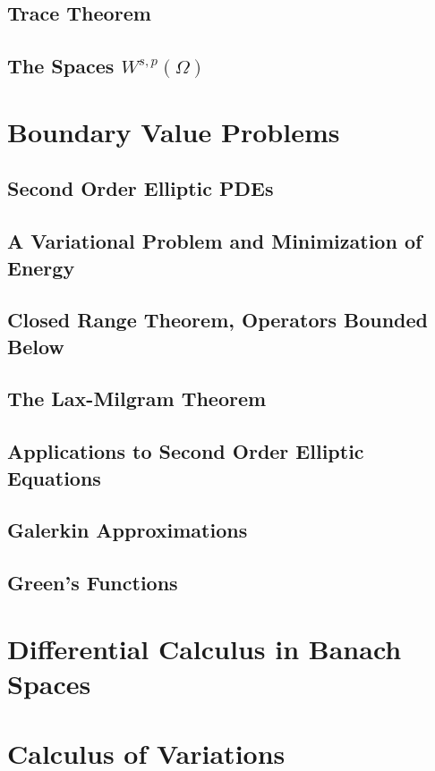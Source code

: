 \documentclass[letterpaper,twoside,12pt]{article}
\theoremstyle{mystyle}
\begin{document}
\subsection{Trace Theorem}
\subsection{The Spaces $W^{s, p}\left( \Omega \right)$}

\newpage\section{Boundary Value Problems}
\subsection{Second Order Elliptic PDEs}
\subsection{A Variational Problem and Minimization of Energy}
\subsection{Closed Range Theorem, Operators Bounded Below}
\subsection{The Lax-Milgram Theorem}
\subsection{Applications to Second Order Elliptic Equations}
\subsection{Galerkin Approximations}
\subsection{Green's Functions}

\newpage\section{Differential Calculus in Banach Spaces}
\newpage\section{Calculus of Variations }
\end{document}

